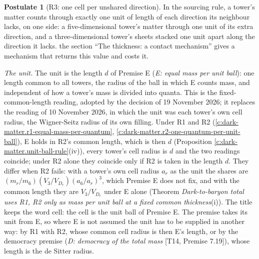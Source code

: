 \documentclass[11pt]{article}
\theoremstyle{definition}
\newtheorem{postulate}[theorem]{Postulate}
\theoremstyle{plain}
\begin{document}
\begin{postulate}[R3: one cell per unshared direction]\label{c:dark-matter.r3-one-cell-per-unshared-direction}
In the sourcing rule, a tower's matter counts through exactly one unit of length of each direction its neighbour lacks, on one side: a five-dimensional tower's matter through one unit of its extra direction, and a three-dimensional tower's sheets stacked one unit apart along the direction it lacks. the section ``The thickness: a contact mechanism'' gives a mechanism that returns this value and costs it.

\emph{The unit.} The unit is the length $d$ of Premise E (\emph{E: equal mass per unit ball}): one length common to all towers, the radius of the ball in which E counts mass, and independent of how a tower's mass is divided into quanta. This is the fixed-common-length reading, adopted by the decision of 19 November 2026; it replaces the reading of 10 November 2026, in which the unit was each tower's own cell radius, the Wigner-Seitz radius of its own filling. Under R1 and R2 (\ref{c:dark-matter.r1-equal-mass-per-quantum}, \ref{c:dark-matter.r2-one-quantum-per-unit-ball}), E holds in R2's common length, which is then $d$ (Proposition \ref{c:dark-matter.unit-ball-rule}(iv)), every tower's cell radius is $d$ and the two readings coincide; under R2 alone they coincide only if R2 is taken in the length $d$. They differ when R2 fails: with a tower's own cell radius $a_{r}$ as the unit the shares are $(m_{r}/m_{6})(V_{3}/V_{D_{r}})(a_{6}/a_{r})^{3}$, which Premise E does not fix, and with the common length they are $V_{3}/V_{D_{r}}$ under E alone (Theorem \emph{Dark-to-baryon total uses R1, R2 only as mass per unit ball at a fixed common thickness}(i)). The title keeps the word cell: the cell is the unit ball of Premise E. The premise takes its unit from E, so where E is not assumed the unit has to be supplied in another way: by R1 with R2, whose common cell radius is then E's length, or by the democracy premise (\emph{D: democracy of the total mass} [T14, Premise 7.19]), whose length is the de Sitter radius.
\end{postulate}
\end{document}
